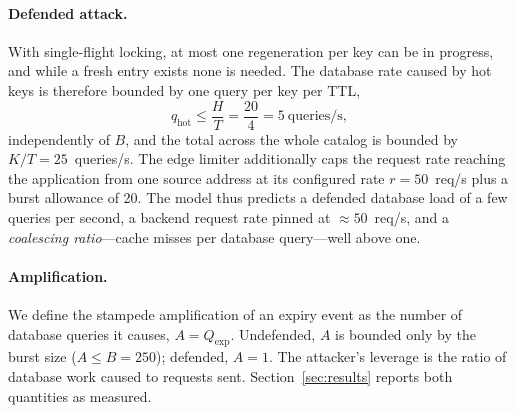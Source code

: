 \paragraph{Defended attack.} With single-flight locking, at most one regeneration per
key can be in progress, and while a fresh entry exists none is needed. The database
rate caused by hot keys is therefore bounded by one query per key per TTL,
\begin{equation}
q_{\mathrm{hot}} \le \frac{H}{T} = \frac{20}{4} = 5~\text{queries/s},
\label{eq:defended}
\end{equation}
independently of $B$, and the total across the whole catalog is bounded by
$K/T=25$~queries/s. The edge limiter additionally caps the request rate reaching the
application from one source address at its configured rate $r=50$~req/s plus a burst
allowance of 20. The model thus predicts a defended database load of a few queries per
second, a backend request rate pinned at ${\approx}50$~req/s, and a \emph{coalescing
ratio}---cache misses per database query---well above one.

\paragraph{Amplification.} We define the stampede amplification of an expiry event as
the number of database queries it causes, $A=Q_{\mathrm{exp}}$. Undefended, $A$ is
bounded only by the burst size ($A\le B=250$); defended, $A=1$. The attacker's leverage
is the ratio of database work caused to requests sent. Section~\ref{sec:results}
reports both quantities as measured.
